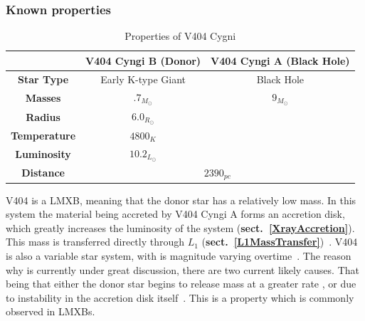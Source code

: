 \documentclass[12pt, a4paper]{article}
\begin{document}
        \subsubsection{Known properties}
        \begin{table} [H]
            \begin{center} 
                \begin{tabular}{||c || c | c||} 
                 \hline
                 & \textbf{V404 Cyngi B (Donor)} & \textbf{V404 Cyngi A (Black Hole)} \\ 
                 \hline\hline
                 \textbf{Star Type} & Early K-type Giant & Black Hole \\ 
                 \hline
                 \textbf{Masses}& $.7_{M_\odot}$ \cite{Bernardini_2016} & $9_{M_\odot}$ \cite{Shahbaz_1994} \\
                 \hline
                 \textbf{Radius} & $6.0_{R_\odot}$ \cite{Shahbaz_1994} &  \\
                 \hline
                 \textbf{Temperature} & $4800_K$ \cite{Shahbaz_1994} & \\
                 \hline
                 \textbf{Luminosity} & $10.2_{L_\odot}$ \cite{Shahbaz_1994} &  \\ 
                 \hline
                 \textbf{Distance} & \multicolumn{2}{c||}{$2390_{pc}$ \cite{Bernardini_2016}} \\
                 \hline
            \end{tabular}
            \caption{Properties of V404 Cygni} 
            \label{V404Data} 
            \end{center}
        \end{table}

        V404 is a LMXB, meaning that the donor star has a relatively low mass. In this system the material being accreted by V404 Cyngi A forms an accretion disk, which greatly increases the luminosity of the system (\textbf{sect.~\ref{XrayAccretion}}). This mass is transferred directly through $L_1$ (\textbf{sect.~\ref{L1MassTransfer}})~\cite{Bartolomeo_2023}. V404 is also a variable star system, with is magnitude varying overtime~\cite{Bernardini_2016}. The reason why is currently under great discussion, there are two current likely causes. That being that either the donor star begins to release mass at a greater rate \cite{TanakaLewin_1995}, or due to instability in the accretion disk itself~\cite{Lasota_2001}. This is a property which is commonly observed in LMXBs. 
\end{document}
